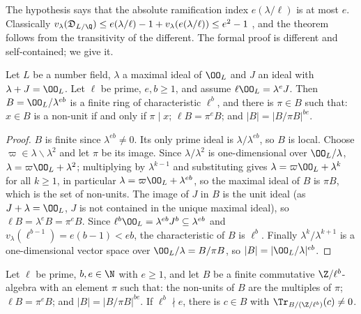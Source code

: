 The hypothesis says that the absolute ramification index $e(\lambda/\ell)$ is at most $e$. Classically
$v_\lambda(\mathfrak D_{L/\Q})\le e(\lambda/\ell)-1+v_\lambda(e(\lambda/\ell))\le e^2-1$
\cite[Ch.~III, \S6, Rem.~1 after Prop.~13]{Serre1979}, and the theorem follows from the transitivity of the
different. The formal proof is different and self-contained; we give it.

\begin{lemma}\label{pf:baselat2:quotpow}
Let $L$ be a number field, $\lambda$ a maximal ideal of $\OO_L$ and $J$ an ideal with $\lambda+J=\OO_L$. Let
$\ell$ be prime, $e,b\ge1$, and assume $\ell\OO_L=\lambda^eJ$. Then $B=\OO_L/\lambda^{eb}$ is a finite ring of
characteristic $\ell^b$, and there is $\pi\in B$ such that: $x\in B$ is a non-unit if and only if $\pi\mid x$;
$\ell B=\pi^eB$; and $|B|=|B/\pi B|^{be}$.
\end{lemma}

\begin{proof}
$B$ is finite since $\lambda^{eb}\ne0$. Its only prime ideal is $\lambda/\lambda^{eb}$, so $B$ is local. Choose
$\varpi\in\lambda\smallsetminus\lambda^2$ and let $\pi$ be its image. Since $\lambda/\lambda^2$ is one-dimensional over
$\OO_L/\lambda$, $\lambda=\varpi\OO_L+\lambda^2$; multiplying by $\lambda^{k-1}$ and substituting gives
$\lambda=\varpi\OO_L+\lambda^{k}$ for all $k\ge1$, in particular $\lambda=\varpi\OO_L+\lambda^{eb}$, so the maximal ideal of $B$ is
$\pi B$, which is the set of non-units. The image of $J$ in $B$ is the unit ideal (as $J+\lambda=\OO_L$, $J$ is not
contained in the unique maximal ideal), so $\ell B=\lambda^eB=\pi^eB$. Since $\ell^b\OO_L=\lambda^{eb}J^b\subseteq\lambda^{eb}$
and $v_\lambda(\ell^{b-1})=e(b-1)<eb$, the characteristic of $B$ is $\ell^b$. Finally $\lambda^k/\lambda^{k+1}$ is a
one-dimensional vector space over $\OO_L/\lambda=B/\pi B$, so $|B|=|\OO_L/\lambda|^{eb}$.
\end{proof}

\begin{lemma}\label{pf:baselat2:trace}
Let $\ell$ be prime, $b,e\in\N$ with $e\ge1$, and let $B$ be a finite commutative $\Z/\ell^b$-algebra with an
element $\pi$ such that: the non-units of $B$ are the multiples of $\pi$; $\ell B=\pi^eB$; and
$|B|=|B/\pi B|^{be}$. If $\ell^b\nmid e$, there is $c\in B$ with $\Tr_{B/(\Z/\ell^b)}(c)\ne0$.
\end{lemma}

